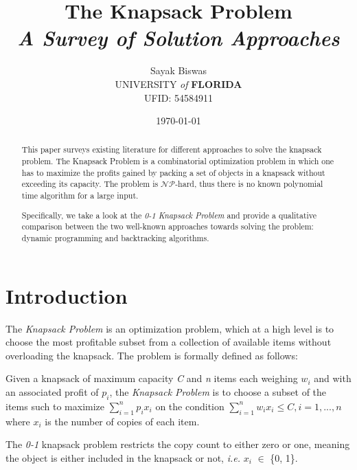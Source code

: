 \documentclass{article}
\title{The Knapsack Problem \\ \small \textit{A Survey of Solution Approaches}}
\date{\small \today}
\author{Sayak Biswas \\ \small UNIVERSITY \textit{of} \textbf{FLORIDA} \\ \small UFID: 54584911}
\begin{document}
\maketitle
\begin{abstract}
This paper surveys existing literature for different approaches to solve the knapsack problem. The Knapsack Problem is a combinatorial optimization problem in which one has to maximize the profits gained by packing a set of objects in a knapsack without exceeding its capacity. The problem is $\mathcal{NP}$-hard, thus there is no known polynomial time algorithm for a large input.

Specifically, we take a look at the \textit{0-1 Knapsack Problem} and provide a qualitative comparison between the two well-known approaches towards solving the problem: dynamic programming and backtracking algorithms.
\end{abstract}
\newpage


\section{Introduction}
The \textit{Knapsack Problem} is an optimization problem, which at a high level is to choose the most profitable subset from a collection of available items without overloading the knapsack. The problem is formally defined as follows:

Given a knapsack of maximum capacity \textit{C} and \textit{n} items each weighing \textit{$w_{i}$} and with an associated profit of \textit{$p_{i}$}, the \textit{Knapsack Problem} is to choose a subset of the items such to maximize $\sum_{i=1}^{n}\textit{$p_{i}x_{i}$}$ on the condition $\sum_{i=1}^{n}\textit{$w_{i}x_{i}$} \leq \textit{C}, \textit{i} = 1,...,\textit{n}$ where \textit{$x_{i}$} is the number of copies of each item.

\iffalse
The \textit{fractional} knapsack problem allows placing a fraction \textit{$x_{i}$} of object \textit{i} into the knapsack \textit{i.e.} $0 \le \textit{$x_{i}$} \le 1$.

The \textit{bounded} knapsack problem restricts each item type to an integer amount of copies \textit{i.e.} \textit{$x_{i}$} $\in \{0,...,m_{i}\}$

The \textit{unbounded} knapsack problem removes any restriction from the number of copies of each object type \textit{i.e.} \textit{$x_{i}$} $\ge$ 0.
\fi

The \textit{0-1} knapsack problem restricts the copy count to either zero or one, meaning the object is either included in the knapsack or not, \textit{i.e.} \textit{$x_{i}$} $\in$ \{0, 1\}.
\end{document}
